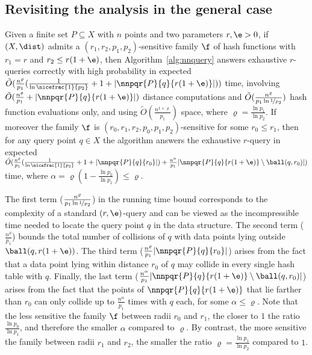 \subsection{Revisiting the analysis in the general case}
\label{sec:erpleb_general}

\begin{thm} \label{thm:allnn}
  Given a finite set $P\subseteq X$ with $n$ points and two parameters
  $r,\e> 0$, if $(X, \dist)$ admits a $(r_1, r_2, p_1,
  p_2)$-sensitive family $\f$ of hash functions with $r_1=r$ and
  $r_2\leq r(1+\e)$, then Algorithm~\ref{alg:nnquery} answers
  exhaustive $r$-\pleb queries correctly with high probability in
  expected $\tilde O(\frac{n^\varrho}{p_1} (\frac{1}{\ln
    \nicefrac{1}{p_2}}+1+|\nnpqr{P}{q}{r(1+\e)}|) )$ time,
  involving $\tilde O(\frac{n^\varrho}{p_1} +
  |\nnpqr{P}{q}{r(1+\e)}|)$ distance computations and $\tilde
  O(\frac{n^\varrho}{p_1 \ln \nicefrac{1}{p_2}})$ hash function
  evaluations only, and using $\tilde O(\frac{n^{1+\varrho}}{p_1})$ space, where
  $\varrho=\frac{\ln p_1}{\ln p_2}$. If moreover the family $\f$ is
  $(r_0, r_1, r_2, p_0, p_1, p_2)$-sensitive for some $r_0\leq r_1$,
  then for any query point $q\in X$ the algorithm answers the exhaustive
  $r$-\pleb query in expected $\tilde O(\frac{n^\varrho}{p_1}(\frac{1}{\ln
    \nicefrac{1}{p_2}}+1+|\nnpqr{P}{q}{r_0}|) +
  \frac{n^\alpha}{p_1}|\nnpqr{P}{q}{r(1+\e)}\setminus \ball(q, r_0)|)$
  time, where $\alpha=\varrho(1-\frac{\ln p_0}{\ln p_1})\leq\varrho$.
\end{thm}

The first term ($\frac{n^\varrho}{p_1 \ln \nicefrac{1}{p_2}}$) in the
running time bound corresponds to the complexity of a standard
$(r,\e)$-\pleb query and can be viewed as the incompressible time
needed to locate the query point $q$ in the data structure. The second
term ($\frac{n^\varrho}{p_1}$) bounds the total number of collisions
of $q$ with data points lying outside $\ball(q, r(1+\e))$.  The third
term ($\frac{n^\varrho}{p_1} |\nnpqr{P}{q}{r_0}|$) arises from the
fact that a data point lying within distance $r_0$ of $q$ may
collide in every single hash table with $q$. Finally, the last term
($\frac{n^\alpha}{p_1} |\nnpqr{P}{q}{r(1+\e)}\setminus\ball(q,r_0)|$)
arises from the fact that the points of $\nnpqr{P}{q}{r(1+\e)}$ that
lie farther than $r_0$ can only collide up to $\frac{n^\alpha}{p_1}$
times with $q$ each, for some $\alpha\leq\varrho$. Note that the less
sensitive the family $\f$ between radii $r_0$ and $r_1$, the closer to
$1$ the ratio $\frac{\ln p_0}{\ln p_1}$, and therefore the smaller
$\alpha$ compared to $\varrho$. By contrast, the more sensitive the
family between radii $r_1$ and $r_2$, the smaller the ratio
$\varrho=\frac{\ln p_1}{\ln p_2}$ compared to $1$.

